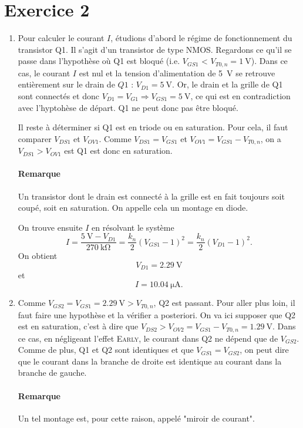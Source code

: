 \section{Exercice 2}
\begin{enumerate}
	\item Pour calculer le courant $I$, étudions d'abord le régime de fonctionnement
	du transistor Q1. Il s'agit d'un transistor de type NMOS. Regardons ce qu'il se
	passe dans l'hypothèse où Q1 est bloqué (i.e. $V_{GS1}$ < $V_{T0,n} = \SI{1}{\volt}$).
	Dans ce cas, le courant $I$ est nul et la tension d'alimentation de \SI{5}{\volt} se
	retrouve entièrement sur le drain de $Q1$ : $V_{D1} = \SI{5}{\volt}$. Or, le drain
	et la grille de Q1 sont connectés et donc $V_{D1} = V_{G1} \Rightarrow V_{GS1}
	= \SI{5}{\volt}$, ce qui est en contradiction avec l'hyptohèse de départ. Q1 ne peut
	donc pas être bloqué.
	
	Il reste à déterminer si Q1 est en triode ou en saturation. Pour cela, il faut
	comparer $V_{DS1}$ et $V_{OV1}$. Comme $V_{DS1} = V_{GS1}$ et $V_{OV1} = V_{GS1} -
	V_{T0,n}$, on a $V_{DS1} > V_{OV1}$ est Q1 est donc en saturation.
	\paragraph*{Remarque} Un transistor dont le drain est connecté à la grille est en
	fait toujours soit coupé, soit en saturation. On appelle cela un montage en diode.
	
	On trouve ensuite $I$ en résolvant le système	
	\[ I = \frac{\SI{5}{\volt}-V_{D1}}{\SI{270}{\kilo\ohm}} = \frac{k_n}{2}(V_{GS1} - 1)^2 =
        \frac{k_n}{2}(V_{D1} - 1)^2.\]	
	On obtient
	\[ V_{D1} = \SI{2.29}{\volt} \]
	et
	\[ I = \SI{10.04}{\micro\ampere}. \]
	
	\item Comme $V_{GS2}  = V_{GS1} = \SI{2.29}{\volt} > V_{T0,n}$, Q2 est passant. Pour aller
	plus loin, il faut faire une hypothèse et la vérifier a posteriori. On va ici supposer
	que Q2 est en saturation, c'est à dire que $V_{DS2} > V_{OV2} = V_{GS1} - V_{T0,n} =
	\SI{1.29}{\volt}$. Dans ce cas, en négligeant l'effet \textsc{Early}, le courant dans Q2
	ne dépend que de $V_{GS2}$. Comme de plus, Q1 et Q2 sont identiques et que $V_{GS1} = V_{GS2}$,
	on peut dire que le courant dans la branche de droite est identique au courant dans la branche
	de gauche.
	\paragraph{Remarque} Un tel montage est, pour cette raison, appelé "miroir de courant".
	

\end{enumerate}
